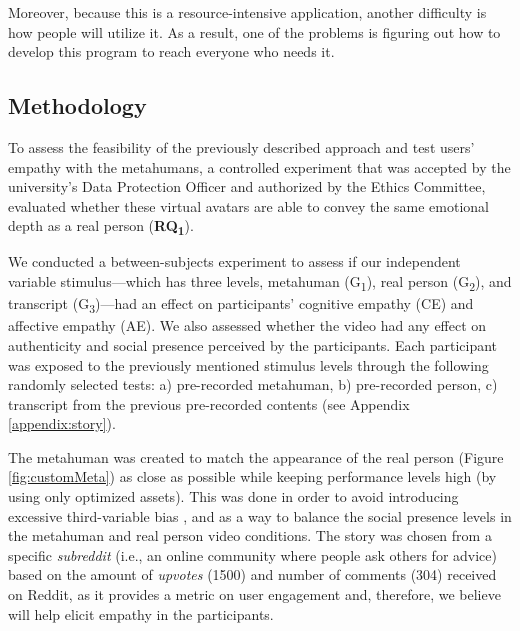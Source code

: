 Moreover, because this is a resource-intensive application, another difficulty is how people will utilize it. As a result, one of the problems is figuring out how to develop this program to reach everyone who needs it. 

\subsection{Methodology}
To assess the feasibility of the previously described approach and test users' empathy with the metahumans, a controlled experiment that was accepted by the university's Data Protection Officer and authorized by the Ethics Committee, evaluated whether these virtual avatars are able to convey the same emotional depth as a real person (\textbf{RQ\textsubscript{1}}).

We conducted a between-subjects experiment to assess if our independent variable stimulus---which has three levels, metahuman (G\textsubscript{1}), real person (G\textsubscript{2}), and transcript (G\textsubscript{3})---had an effect on participants' cognitive empathy (CE) and affective empathy (AE). We also assessed whether the video had any effect on authenticity and social presence perceived by the participants. Each participant was exposed to the previously mentioned stimulus levels through the following randomly selected tests: a) pre-recorded metahuman, b) pre-recorded person, c) transcript from the previous pre-recorded contents (see Appendix \ref{appendix:story}).

The metahuman was created to match the appearance of the real person (Figure \ref{fig:customMeta}) as close as possible while keeping performance levels high (by using only optimized assets). This was done in order to avoid introducing excessive third-variable bias \cite{ROT19}, and as a way to balance the social presence levels in the metahuman and real person video conditions. The story was chosen from a specific \textit{subreddit} (i.e., an online community where people ask others for advice) based on the amount of \textit{upvotes} (1500) and number of comments (304) received on Reddit, as it provides a metric on user engagement and, therefore, we believe will help elicit empathy in the participants.

